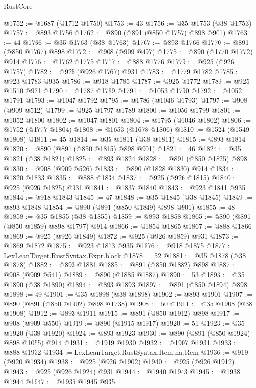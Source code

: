 \begin{lexlean}{RustCore}
\begin{coremodule}
@1752 := @1687 (@1712 @1750)
@1753 := 43
@1756 := @35 @1753 (@38 @1753)
@1757 := @893 @1756
@1762 := @890 (@891 (@850 @1757) @898 @901)
@1763 := 44
@1766 := @35 @1763 (@38 @1763)
@1767 := @893 @1766
@1770 := @891 (@850 @1767) @898
@1772 := @908 (@909 @497)
@1775 := @890 (@1770 @1772) @914
@1776 := @1762 @1775
@1777 := @888 @1776
@1779 := @925 (@926 @1757)
@1782 := @925 (@926 @1767) @931
@1783 := @1779 @1782
@1785 := @923 @1783 @935
@1786 := @918 @1785
@1787 := @925 @1772
@1789 := @925 @1510 @931
@1790 := @1787 @1789
@1791 := @1053 @1790
@1792 := @1052 @1791
@1793 := @1047 @1792
@1795 := @1786 (@1046 @1793)
@1797 := @908 (@909 @512)
@1799 := @925 @1797 @1789
@1800 := @1056 @1799
@1801 := @1052 @1800
@1802 := @1047 @1801
@1804 := @1795 (@1046 @1802)
@1806 := @1752 (@1777 @1804)
@1808 := @1653 (@1678 @1806)
@1810 := @1524 (@1549 @1808)
@1811 := 45
@1814 := @35 @1811 (@38 @1811)
@1815 := @893 @1814
@1820 := @890 (@891 (@850 @1815) @898 @901)
@1821 := 46
@1824 := @35 @1821 (@38 @1821)
@1825 := @893 @1824
@1828 := @891 (@850 @1825) @898
@1830 := @908 (@909 @526)
@1833 := @890 (@1828 @1830) @914
@1834 := @1820 @1833
@1835 := @888 @1834
@1837 := @925 (@926 @1815)
@1840 := @925 (@926 @1825) @931
@1841 := @1837 @1840
@1843 := @923 @1841 @935
@1844 := @918 @1843
@1845 := 47
@1848 := @35 @1845 (@38 @1845)
@1849 := @893 @1848
@1854 := @890 (@891 (@850 @1849) @898 @901)
@1855 := 48
@1858 := @35 @1855 (@38 @1855)
@1859 := @893 @1858
@1865 := @890 (@891 (@850 @1859) @898 @1797) @914
@1866 := @1854 @1865
@1867 := @888 @1866
@1869 := @925 (@926 @1849)
@1872 := @925 (@926 @1859) @931
@1873 := @1869 @1872
@1875 := @923 @1873 @935
@1876 := @918 @1875
@1877 := LexLeanTarget.RustSyntax.Expr.block
@1878 := 52
@1881 := @35 @1878 (@38 @1878)
@1882 := @893 @1881
@1885 := @891 (@850 @1882) @898
@1887 := @908 (@909 @541)
@1889 := @890 (@1885 @1887)
@1890 := 53
@1893 := @35 @1890 (@38 @1890)
@1894 := @893 @1893
@1897 := @891 (@850 @1894) @898
@1898 := 49
@1901 := @35 @1898 (@38 @1898)
@1902 := @893 @1901
@1907 := @890 (@891 (@850 @1902) @898 @1738)
@1908 := 50
@1911 := @35 @1908 (@38 @1908)
@1912 := @893 @1911
@1915 := @891 (@850 @1912) @898
@1917 := @908 (@909 @550)
@1919 := @890 (@1915 @1917)
@1920 := 51
@1923 := @35 @1920 (@38 @1920)
@1924 := @893 @1923
@1930 := @890 (@891 (@850 @1924) @898 @1055) @914
@1931 := @1919 @1930
@1932 := @1907 @1931
@1933 := @888 @1932
@1934 := LexLeanTarget.RustSyntax.Item.natRem
@1936 := @919 (@920 @1934)
@1938 := @925 (@926 @1902)
@1940 := @925 (@926 @1912)
@1943 := @925 (@926 @1924) @931
@1944 := @1940 @1943
@1945 := @1938 @1944
@1947 := @1936 @1945 @935

\end{coremodule}
\end{lexlean}
